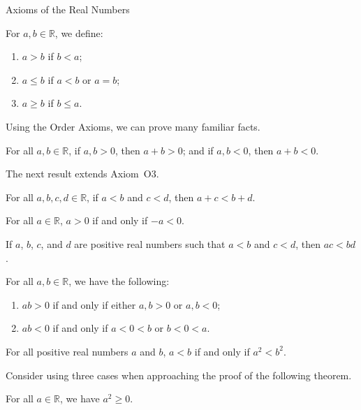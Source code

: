 \begin{section}{Axioms of the Real Numbers}
\begin{definition}
For $a,b\in\mathbb{R}$, we define:
\begin{enumerate}[label=\textrm{(\alph*)}]
\item $\boxed{a>b}$ if $b<a$;
\item $\boxed{a\leq b}$ if $a<b$ or $a=b$;
\item $\boxed{a\geq b}$ if $b\leq a$.
\end{enumerate}
\end{definition}

Using the Order Axioms, we can prove many familiar facts. 

\begin{theorem}
For all $a,b\in\mathbb{R}$, if $a,b>0$, then $a+b>0$; and if $a,b<0$, then $a+b<0$.
\end{theorem}

The next result extends Axiom~O3.

\begin{theorem}
For all $a,b,c,d\in\mathbb{R}$, if $a<b$ and $c<d$, then $a+c<b+d$.
\end{theorem}

\begin{theorem}\label{thm:additive inverse of a positive is negative}
For all $a\in\mathbb{R}$, $a>0$ if and only if $-a<0$.
\end{theorem}

\begin{theorem}
If $a$, $b$, $c$, and $d$ are positive real numbers such that $a<b$ and $c<d$, then $ac<bd$.
\end{theorem}

\begin{theorem}
For all $a,b\in\mathbb{R}$, we have the following:
\begin{enumerate}[label=\textrm{(\alph*)}]
\item $ab>0$ if and only if either $a,b>0$ or $a,b<0$;
\item $ab<0$ if and only if $a<0<b$ or $b<0<a$.
\end{enumerate}
\end{theorem}

\begin{theorem}
For all positive real numbers $a$ and $b$, $a< b$ if and only if $a^2< b^2$.
\end{theorem}

Consider using three cases when approaching the proof of the following theorem.

\begin{theorem}
For all $a\in\mathbb{R}$, we have $a^2\geq 0$.
\end{theorem}


\end{section}
